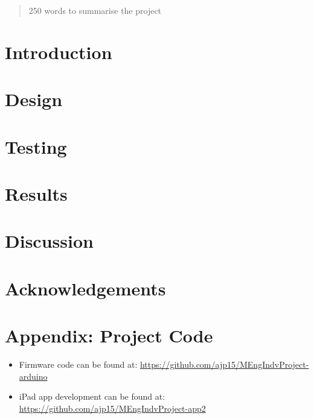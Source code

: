 \documentclass[12pt,twoside]{article}
\begin{document}


\begin{abstract}
    250 words to summarise the project
    
\end{abstract}

\newpage

\section{Introduction}


\section{Design}


\section{Testing}


\section{Results}


\section{Discussion}


\section{Acknowledgements}

\newpage

%


\newpage

\appendix
\section{Appendix: Project Code}
\label{appendix: a}
\begin{itemize}
    \item Firmware code can be found at: \newline \url{https://github.com/ajp15/MEngIndvProject-arduino}
    \item iPad app development can be found at: \newline \url{https://github.com/ajp15/MEngIndvProject-app2}
\end{itemize}
\end{document}
